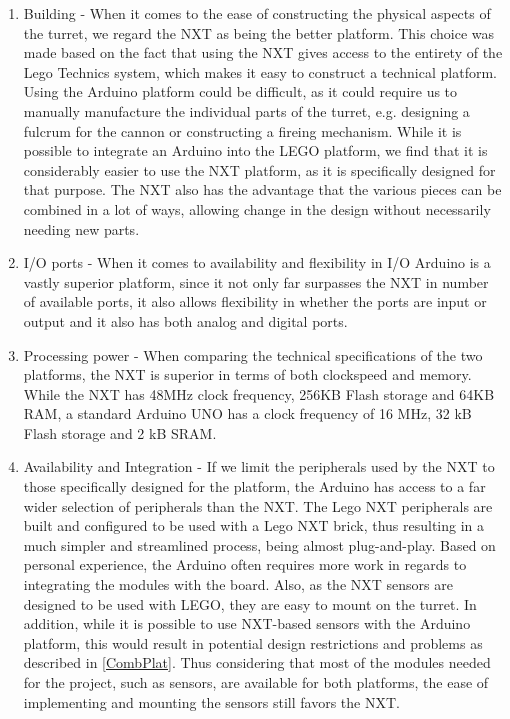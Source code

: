 \begin{enumerate}
  \item Building - When it comes to the ease of constructing the physical
  aspects of the turret, we regard the NXT as being the better platform. This
  choice was made based on the fact that using the NXT gives access to the
  entirety of the Lego Technics system, which makes it easy to construct a
  technical platform. Using the Arduino platform could be difficult, as it could
  require us to manually manufacture the individual parts of the turret, e.g.
  designing a fulcrum for the cannon or constructing a fireing mechanism.
  While it is possible to integrate an Arduino into the LEGO platform, we find
  that it is considerably easier to use the NXT platform, as it is specifically
  designed for that purpose. The NXT also has the advantage that the various
  pieces can be combined in a lot of ways, allowing change in the design without
  necessarily needing new parts.

  \item I/O ports - When it comes to availability and flexibility in I/O
  Arduino is a vastly superior platform, since it not only far surpasses the NXT
  in number of available ports, it also allows flexibility in whether the ports
  are input or output and it also has both analog and digital ports.
  
  \item Processing power - When comparing the technical specifications of the
  two platforms, the NXT is superior in terms of both clockspeed and memory.
  While the NXT has 48MHz clock frequency, 256KB Flash storage and 64KB RAM, a
  standard Arduino UNO has a clock frequency of 16 MHz, 32 kB Flash storage and
  2 kB SRAM.
  
  \item Availability and Integration - If we limit the peripherals used by the
  NXT to those specifically designed for the platform, the Arduino has access
  to a far wider selection of peripherals than the NXT. The Lego NXT
  peripherals are built and configured to be used with a Lego NXT brick, thus
  resulting in a much simpler and streamlined process, being almost
  plug-and-play. Based on personal experience, the Arduino often requires more
  work in regards to integrating the modules with the board. Also, as the NXT
  sensors are designed to be used with LEGO, they are easy to mount on the
  turret. In addition, while it is possible to use NXT-based sensors with the
  Arduino platform, this would result in potential design restrictions and
  problems as described in \autoref{CombPlat}. Thus considering that most of
  the modules needed for the project, such as sensors, are available for both
  platforms, the ease of implementing and mounting the sensors still favors the
  NXT.
\end{enumerate}


